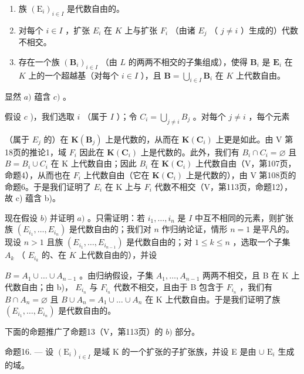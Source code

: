 \begin{enumerate}
\def\labelenumi{\alph{enumi})}
\item
  族 \((\mathrm{E}_i)_{i\in I}\) 是代数自由的。
\item
  对每个 \(i \in I\) ，扩张 \(E_i\) 在 \(K\) 上与扩张 \(F_i\) （由诸 \(E_j\) （ \(j \neq i\) ）生成的）代数不相交。
\item
  存在一个族 \((\mathbf{B}_i)_{i\in I}\) （由 \(L\) 的两两不相交的子集组成），使得 \(\mathbf{B}_i\) 是 \(\mathbf{E}_i\) 在 \(K\) 上的一个超越基（对每个 \(i\in I\) ），且 \(\mathbf{B} = \bigcup_{i\in I}\mathbf{B}_i\) 在 \(K\) 上代数自由。
\end{enumerate}

显然 \(a)\) 蕴含 \(c)\) 。

假设 \(c\) )，我们选取 \(i\) （属于 \(I\) ）；令 \(C_i = \bigcup_{j \neq i} B_j\) 。对每个 \(j \neq i\) ，每个元素

（属于 \(E_{j}\) 的）在 \(\mathbf{K}(\mathbf{B}_{j})\) 上是代数的，从而在 \(\mathbf{K}(\mathbf{C}_{i})\) 上更是如此。由 V 第18页的推论1，域 \(F_{i}\) 因此在 \(\mathbf{K}(\mathbf{C}_{i})\) 上是代数的。此外，我们有 \(B_{i} \cap C_{i} = \varnothing\) 且 \(B = B_{i} \cup C_{i}\) 在 K 上代数自由；因此 \(B_{i}\) 在 \(\mathbf{K}(\mathbf{C}_{i})\) 上代数自由（V，第107页，命题4），从而也在 \(F_{i}\) 上代数自由（它在 \(\mathbf{K}(\mathbf{C}_{i})\) 上是代数的），由 V 第108页的命题6。于是我们证明了 \(E_{i}\) 在 K 上与 \(F_{i}\) 代数不相交（V，第113页，命题12），故 c) 蕴含 b)。

现在假设 \(b)\) 并证明 \(a)\) 。只需证明：若 \(i_1, \ldots, i_n\) 是 \(I\) 中互不相同的元素，则扩张族 \((E_{i_1}, \ldots, E_{i_n})\) 是代数自由的；我们对 \(n\) 作归纳论证，情形 \(n = 1\) 是平凡的。现设 \(n > 1\) 且族 \((E_{i_1}, \ldots, E_{i_{n-1}})\) 是代数自由的；对 \(1 \leqslant k \leqslant n\) ，选取一个子集 \(A_k\) （ \(E_{i_k}\) 的、在 \(K\) 上代数自由的），并设

\(B = A_{1} \cup \ldots \cup A_{n-1}\) 。由归纳假设，子集 \(A_{1}, \ldots, A_{n-1}\) 两两不相交，且 B 在 K 上代数自由；由 b)， \(E_{i_{n}}\) 与 \(F_{i_{n}}\) 代数不相交，且由于 B 包含于 \(F_{i_{n}}\) ，我们有 \(B \cap A_{n} = \varnothing\) 且 \(B \cup A_{n} = A_{1} \cup \ldots \cup A_{n}\) 在 K 上代数自由。于是我们证明了族 \((E_{i_{1}}, \ldots, E_{i_{n}})\) 是代数自由的。

下面的命题推广了命题13（V，第113页）的 \(b)\) 部分。

命题16. --- 设 \((\mathrm{E}_i)_{i\in I}\) 是域 K 的一个扩张的子扩张族，并设 E 是由 \(\cup\) \(\mathrm{E}_i\) 生成的域。

